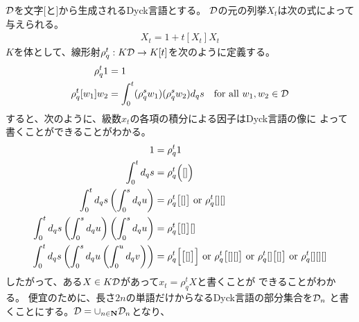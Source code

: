{	\begin{todo}[ここまで]\label{todo:ここまで} %
	\end{todo} %
	
	
	${{\mathcal{D}}}$を文字$[$と$]$から生成されるDyck言語とする。
	${{\mathcal{D}}}$の元の列挙$X_t$は次の式によって与えられる。
	\begin{equation*}\begin{split}
		X_t = 1 + t[X_t]X_t
	\end{split}\end{equation*}
	$K$を体として、線形射$\rho_q^t:K{{\mathcal{D}}}\to K[t]$を次のように定義する。
	\begin{equation*}\begin{split}
		\rho_q^t1 &= 1 \\ 
		\rho_q^t[w_1]w_2 &= \int_0^t(\rho_q^sw_1)(\rho_q^sw_2)d_qs
		\quad\text{for all } w_1,w_2\in{\ensuremath{{\mathcal{D}}}}
	\end{split}\end{equation*}
	すると、次のように、級数$x_t$の各項の積分による因子はDyck言語の像に
	よって書くことができることがわかる。
	\begin{equation*}\begin{split}
		1 &= \rho_q^t1 \\
		\int_0^td_qs &= \rho_q^t\Bigl({[]}\Bigr) \\
		\int_0^td_qs\left({\int_0^sd_qu}\right) &= \rho_q^t\bigl[{[]}\bigr]
			\text{ or } \rho_q^t[][] \\
		\int_0^td_qs\left({\int_0^sd_qu}\right)\left({\int_0^sd_qu}\right) &=\rho_q^t\bigl[{[]}\bigr][] \\
		\int_0^td_qs\left({\int_0^sd_qu\left({\int_0^ud_qv}\right)}\right) 
		&= \rho_q^t\Bigl[{\bigl[{[]}\bigr]}\Bigr] \text{ or } \rho_q^t\bigl[{[][]}\bigr]
			\text{ or } \rho_q^t[]\bigl[{[]}\bigr] \text{ or } \rho_q^t[][][] \\
	\end{split}\end{equation*}
	したがって、ある$X\in K{{\mathcal{D}}}$があって$x_t=\rho_q^tX$と書くことが
	できることがわかる。
	便宜のために、長さ$2n$の単語だけからなるDyck言語の部分集合を${{\mathcal{D}}}_n$
	と書くことにする。${{\mathcal{D}}}=\cup_{n\in\mathbf{N}}{{\mathcal{D}}}_n$となり、

}
